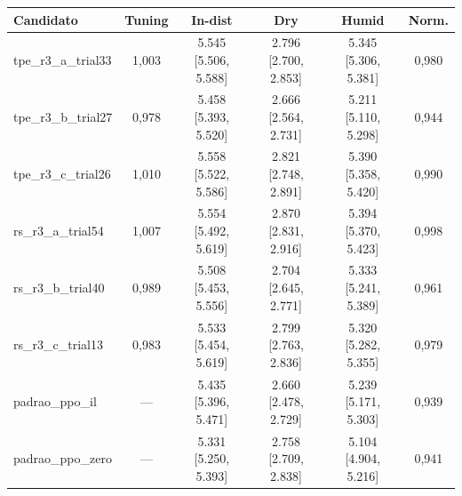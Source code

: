 \begin{tabular}{l c c c c c}
\hline
\textbf{Candidato} & \textbf{Tuning} & \textbf{In-dist} & \textbf{Dry} & \textbf{Humid} & \textbf{Norm.} \\ \hline
tpe\_r3\_a\_trial33 & 1,003 & 5.545 [5.506, 5.588] & 2.796 [2.700, 2.853] & 5.345 [5.306, 5.381] & 0,980 \\
tpe\_r3\_b\_trial27 & 0,978 & 5.458 [5.393, 5.520] & 2.666 [2.564, 2.731] & 5.211 [5.110, 5.298] & 0,944 \\
tpe\_r3\_c\_trial26 & 1,010 & 5.558 [5.522, 5.586] & 2.821 [2.748, 2.891] & 5.390 [5.358, 5.420] & 0,990 \\
rs\_r3\_a\_trial54 & 1,007 & 5.554 [5.492, 5.619] & 2.870 [2.831, 2.916] & 5.394 [5.370, 5.423] & 0,998 \\
rs\_r3\_b\_trial40 & 0,989 & 5.508 [5.453, 5.556] & 2.704 [2.645, 2.771] & 5.333 [5.241, 5.389] & 0,961 \\
rs\_r3\_c\_trial13 & 0,983 & 5.533 [5.454, 5.619] & 2.799 [2.763, 2.836] & 5.320 [5.282, 5.355] & 0,979 \\
padrao\_ppo\_il & --- & 5.435 [5.396, 5.471] & 2.660 [2.478, 2.729] & 5.239 [5.171, 5.303] & 0,939 \\
padrao\_ppo\_zero & --- & 5.331 [5.250, 5.393] & 2.758 [2.709, 2.838] & 5.104 [4.904, 5.216] & 0,941 \\
\hline
\end{tabular}
